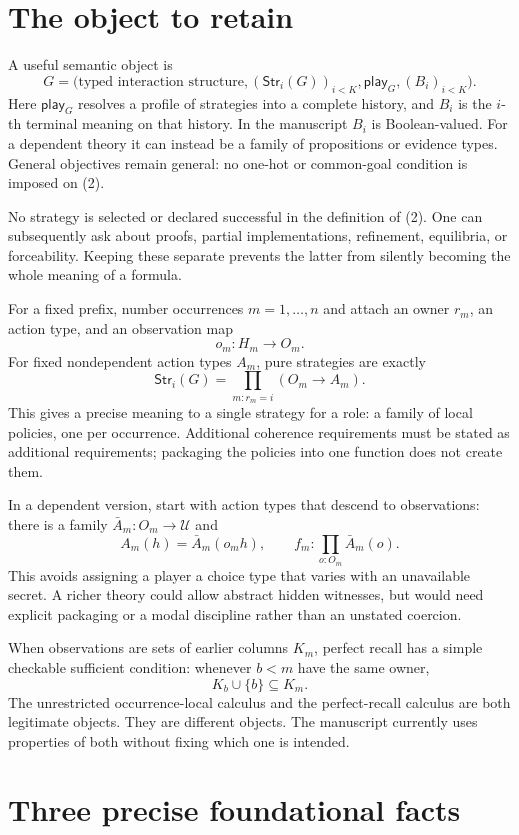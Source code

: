 \documentclass[11pt]{article}
\newcommand{\Str}{\mathsf{Str}}
\newcommand{\Play}{\mathsf{play}}
\begin{document}
\section{The object to retain}

A useful semantic object is
\[
 G=\bigl(\text{typed interaction structure},
          (\Str_i(G))_{i<K},\Play_G,(B_i)_{i<K}\bigr).
 \tag{2}
\]
Here $\Play_G$ resolves a profile of strategies into a complete history, and $B_i$
is the $i$-th terminal meaning on that history. In the manuscript $B_i$ is
Boolean-valued. For a dependent theory it can instead be a family of propositions
or evidence types. General objectives remain general: no one-hot or common-goal
condition is imposed on (2).

No strategy is selected or declared successful in the definition of (2).
One can subsequently ask about proofs, partial implementations, refinement,
equilibria, or forceability. Keeping these separate prevents the latter from
silently becoming the whole meaning of a formula.

For a fixed prefix, number occurrences $m=1,\ldots,n$ and attach an owner $r_m$,
an action type, and an observation map
\[
 o_m:H_m\longrightarrow O_m.
\]
For fixed nondependent action types $A_m$, pure strategies are exactly
\[
 \Str_i(G)=\prod_{m:r_m=i}(O_m\longrightarrow A_m).
 \tag{3}
\]
This gives a precise meaning to a single strategy for a role: a family of local
policies, one per occurrence. Additional coherence requirements must be stated
as additional requirements; packaging the policies into one function does not
create them.

In a dependent version, start with action types that descend to observations:
there is a family $\bar A_m:O_m\to\mathcal U$ and
\[
 A_m(h)=\bar A_m(o_m h),\qquad
 f_m:\prod_{o:O_m}\bar A_m(o).
 \tag{4}
\]
This avoids assigning a player a choice type that varies with an unavailable
secret. A richer theory could allow abstract hidden witnesses, but would need
explicit packaging or a modal discipline rather than an unstated coercion.

When observations are sets of earlier columns $K_m$, perfect recall has a simple
checkable sufficient condition: whenever $b<m$ have the same owner,
\[
 K_b\cup\{b\}\subseteq K_m.
 \tag{5}
\]
The unrestricted occurrence-local calculus and the perfect-recall calculus are
both legitimate objects. They are different objects. The manuscript currently
uses properties of both without fixing which one is intended.

\section{Three precise foundational facts}
\end{document}
